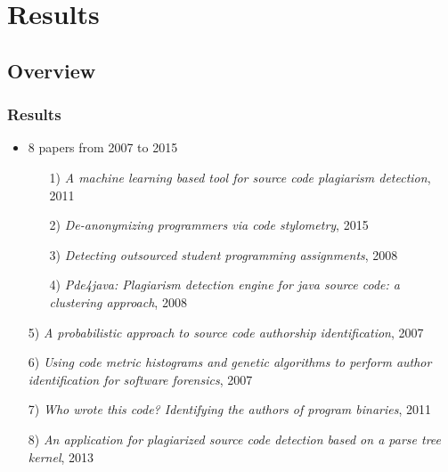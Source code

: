 \documentclass[t,12pt,pdftex]{beamer}
\begin{document}
\section{Results}
\subsection{Overview}
\begin{frame}
	\frametitle{Results}
	\begin{itemize}
		\item 8 papers from 2007 to 2015
		\begin{itemize}
			\item[1)] \textit{A machine learning based tool
for source code plagiarism detection}, 2011
			\item[2)] \textit{De-anonymizing
programmers via code stylometry}, 2015
			\item[3)] \textit{Detecting outsourced student
programming assignments}, 2008
			\item[4)] \textit{Pde4java: Plagiarism detection
engine for java source code: a clustering approach}, 2008
		\end{itemize}
	\end{itemize}
\end{frame}

\begin{frame}
	\vspace{0.5in}
	\begin{itemize}
	\item[5)] \textit{A probabilistic approach to source code authorship identification}, 2007
			\item[6)] \textit{Using code metric histograms and genetic algorithms to perform author identification for software forensics}, 2007
			\item[7)] \textit{Who wrote
this code? Identifying the authors of program binaries}, 2011
			\item[8)] \textit{An application for plagiarized source code detection based on a parse
tree kernel}, 2013
	\end{itemize}
\end{frame}
\end{document}

